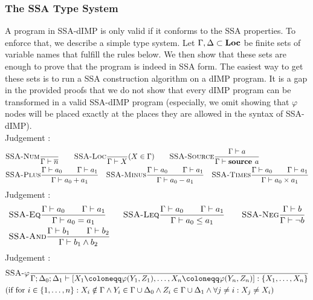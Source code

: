 \subsubsection*{The SSA Type System}
A program in SSA-dIMP is only valid if it conforms to the SSA properties.
To enforce that, we describe a simple type system.
Let $\Gamma, \Delta \subset \textbf{Loc}$ be finite sets of variable names that fulfill the rules below.
We then show that these sets are enough to prove that the program is indeed in SSA form.
The easiest way to get these sets is to run a SSA construction algorithm on a dIMP program.
It is a gap in the provided proofs that we do not show that every dIMP program
can be transformed in a valid SSA-dIMP program (especially, we omit showing that
$\varphi$ nodes will be placed exactly at the places they are allowed in the syntax
of SSA-dIMP).
\\
Judgement :
\begin{align*}
    &\textsc{SSA-Num}\frac{\displaystyle }{\displaystyle \Gamma \vdash {\overline{n}}}\qquad
    \textsc{SSA-Loc}\frac{\displaystyle }{\displaystyle \Gamma \vdash {X}}\text{($X \in \Gamma$)}\qquad
    \textsc{SSA-Source}\frac{\displaystyle \Gamma \vdash {a}}{\displaystyle \Gamma \vdash {\textbf{source }{a}}}\\
    &\textsc{SSA-Plus}\frac{\displaystyle \Gamma \vdash {a_0}\qquad\Gamma \vdash {a_1}}{\displaystyle \Gamma \vdash {a_0+a_1}}\quad
    \textsc{SSA-Minus}\frac{\displaystyle \Gamma \vdash {a_0}\qquad\Gamma \vdash {a_1}}{\displaystyle \Gamma \vdash {a_0-a_1}}\quad
    \textsc{SSA-Times}\frac{\displaystyle \Gamma \vdash {a_0}\qquad\Gamma \vdash {a_1}}{\displaystyle \Gamma \vdash {a_0 \times a_1}}
\end{align*}
Judgement :
\begin{align*}
    &\textsc{SSA-Eq}\frac{\displaystyle \Gamma \vdash {a_0}\qquad \Gamma \vdash {a_1}}{\displaystyle \Gamma \vdash {a_0 = a_1}}\qquad
    \textsc{SSA-Leq}\frac{\displaystyle \Gamma \vdash {a_0}\qquad \Gamma \vdash {a_1}}{\displaystyle \Gamma \vdash {a_0 \leq a_1}}\qquad
    \textsc{SSA-Neg}\frac{\displaystyle \Gamma \vdash {b}}{\displaystyle \Gamma \vdash {\neg b}}\\
    &\textsc{SSA-And}\frac{\displaystyle \Gamma \vdash {b_1}\qquad\Gamma \vdash {b_2}}{\displaystyle \Gamma \vdash {b_1 \land b_2}}\\
\end{align*}
Judgement :
\begin{align*}
    &\trule{SSA-$\varphi$}{}{\typestep{\Gamma;\Delta_0;\Delta_1}{\defaultphilistn}{\{X_1, \ldots, X_n\}}}\\
    &\text{(if for $i \in \{1, \ldots, n\}: X_i \notin \Gamma \land Y_i \in \Gamma \cup \Delta_0 \land Z_i \in \Gamma \cup \Delta_1
    \land \forall j \neq i: X_j \neq X_i$)}
\end{align*}
